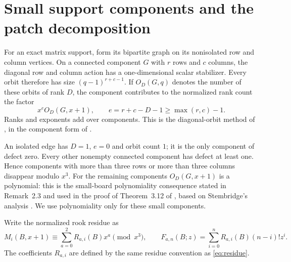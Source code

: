 \documentclass[11pt]{article}
\begin{document}
\section{Small support components and the patch decomposition}

For an exact matrix support, form its bipartite graph on its nonisolated
row and column vertices. On a connected component $G$ with $r$ rows and
$c$ columns, the diagonal row and column action has a one-dimensional
scalar stabilizer. Every orbit therefore has size $(q-1)^{r+c-1}$.
If $O_D(G,q)$ denotes the number of these orbits of rank $D$, the
component contributes to the normalized rank count the factor
\begin{equation}\label{eq:defect}
 x^e O_D(G,x+1),\qquad
 e=r+c-D-1\geq\max(r,c)-1.
\end{equation}
Ranks and exponents add over components. This is the diagonal-orbit
method of \cite[Section~5.1]{LewisEtAl2011}, in the component form
of \cite[Eq.~(3.2)]{ChenSelover2026}.

An isolated edge has $D=1$, $e=0$ and orbit count $1$; it is the only
component of defect zero. Every other nonempty connected component has
defect at least one. Hence components with more than three rows or more
than three columns disappear modulo $x^3$. For the remaining components
$O_D(G,x+1)$ is a polynomial: this is the small-board polynomiality
consequence stated in Remark~2.3 and used in the proof of Theorem~3.12
of \cite{ChenSelover2026}, based on Stembridge's analysis
\cite{Stembridge1998}. We use polynomiality only for these small
components.

Write the normalized rook residue as
\[
 M_i(B,x+1)\equiv\sum_{a=0}^{2}R_{a,i}(B)x^a\pmod{x^3},
 \qquad
 F_{a,n}(B;z)=\sum_{i=0}^{n}R_{a,i}(B)(n-i)!z^i.
\]
The coefficients $R_{a,i}$ are defined by the same residue convention as
\eqref{eq:residue}.
\end{document}

